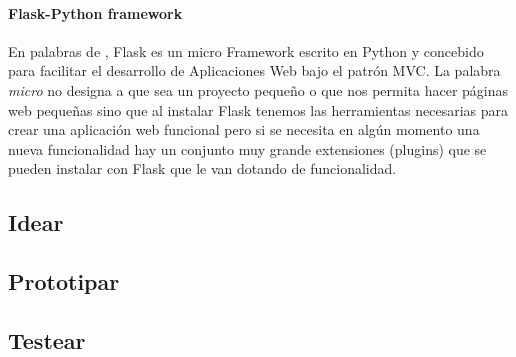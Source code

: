 \paragraph{Flask-Python framework} En palabras de \cite{munoz2017}, Flask es un micro Framework escrito en Python y concebido para facilitar el desarrollo de Aplicaciones Web bajo el patrón MVC. La palabra \textit{micro} no designa a que sea un proyecto pequeño o que nos permita hacer páginas web pequeñas sino que al instalar Flask tenemos las herramientas necesarias para crear una aplicación web funcional pero si se necesita en algún momento una nueva funcionalidad hay un conjunto muy grande extensiones (plugins) que se pueden instalar con Flask que le van dotando de funcionalidad. 

\subsection{Idear}



\subsection{Prototipar}

\subsection{Testear}